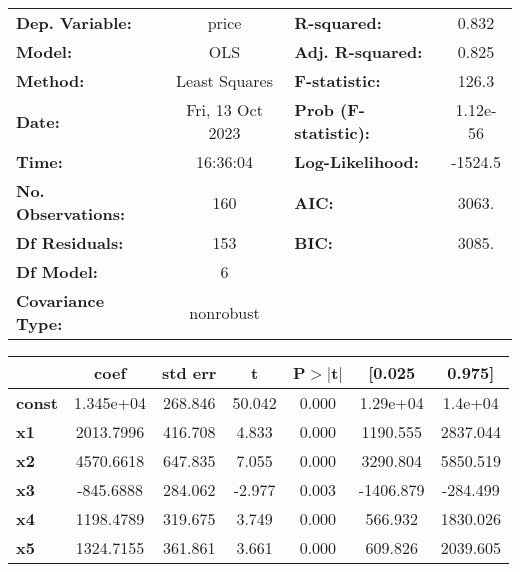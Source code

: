\begin{center}
\begin{tabular}{lclc}
\toprule
\textbf{Dep. Variable:}    &      price       & \textbf{  R-squared:         } &     0.832   \\
\textbf{Model:}            &       OLS        & \textbf{  Adj. R-squared:    } &     0.825   \\
\textbf{Method:}           &  Least Squares   & \textbf{  F-statistic:       } &     126.3   \\
\textbf{Date:}             & Fri, 13 Oct 2023 & \textbf{  Prob (F-statistic):} &  1.12e-56   \\
\textbf{Time:}             &     16:36:04     & \textbf{  Log-Likelihood:    } &   -1524.5   \\
\textbf{No. Observations:} &         160      & \textbf{  AIC:               } &     3063.   \\
\textbf{Df Residuals:}     &         153      & \textbf{  BIC:               } &     3085.   \\
\textbf{Df Model:}         &           6      & \textbf{                     } &             \\
\textbf{Covariance Type:}  &    nonrobust     & \textbf{                     } &             \\
\bottomrule
\end{tabular}
\begin{tabular}{lcccccc}
               & \textbf{coef} & \textbf{std err} & \textbf{t} & \textbf{P$> |$t$|$} & \textbf{[0.025} & \textbf{0.975]}  \\
\midrule
\textbf{const} &    1.345e+04  &      268.846     &    50.042  &         0.000        &     1.29e+04    &      1.4e+04     \\
\textbf{x1}    &    2013.7996  &      416.708     &     4.833  &         0.000        &     1190.555    &     2837.044     \\
\textbf{x2}    &    4570.6618  &      647.835     &     7.055  &         0.000        &     3290.804    &     5850.519     \\
\textbf{x3}    &    -845.6888  &      284.062     &    -2.977  &         0.003        &    -1406.879    &     -284.499     \\
\textbf{x4}    &    1198.4789  &      319.675     &     3.749  &         0.000        &      566.932    &     1830.026     \\
\textbf{x5}    &    1324.7155  &      361.861     &     3.661  &         0.000        &      609.826    &     2039.605     \\

\end{tabular}
\end{center}
